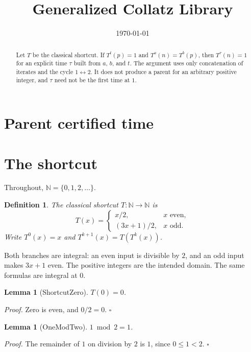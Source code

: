 \documentclass[11pt,letterpaper]{article}
\title{Generalized Collatz Library}
\author{}
\date{\today}
\newcommand{\N}{\mathbb{N}}
\newcommand{\Map}[3]{#1 \colon #2 \to #3}
\newtheorem{lemma}[theorem]{Lemma}
\newtheorem{definition}[theorem]{Definition}
\newenvironment{proof}{\noindent\textit{Proof.}}{\hfill\(\square\)}
\begin{document}
\maketitle
\section*{Parent certified time}

\begin{abstract}
Let \(T\) be the classical shortcut. If \(T^{t}(p)=1\) and \(T^{a}(n)=T^{b}(p)\), then \(T^{\tau}(n)=1\) for an explicit time \(\tau\) built from \(a\), \(b\), and \(t\). The argument uses only concatenation of iterates and the cycle \(1\leftrightarrow 2\). It does not produce a parent for an arbitrary positive integer, and \(\tau\) need not be the first time at \(1\).
\end{abstract}

\section{The shortcut}

Throughout, \(\N=\{0,1,2,\ldots\}\).

\begin{definition}
The classical shortcut \(\Map{T}{\N}{\N}\) is
\[
  T(x)=
  \begin{cases}
    x/2,&x\text{ even},\\
    (3x+1)/2,&x\text{ odd}.
  \end{cases}
\]
Write \(T^{0}(x)=x\) and \(T^{k+1}(x)=T(T^{k}(x))\).
\end{definition}

Both branches are integral: an even input is divisible by \(2\), and an odd input makes \(3x+1\) even. The positive integers are the intended domain. The same formulas are integral at \(0\).

\begin{lemma}[ShortcutZero]
\(T(0)=0\).
\end{lemma}

\begin{proof}
Zero is even, and \(0/2=0\).
\end{proof}

\begin{lemma}[OneModTwo]
\(1\bmod 2=1\).
\end{lemma}

\begin{proof}
The remainder of \(1\) on division by \(2\) is \(1\), since \(0\le 1<2\).
\end{proof}
\end{document}
